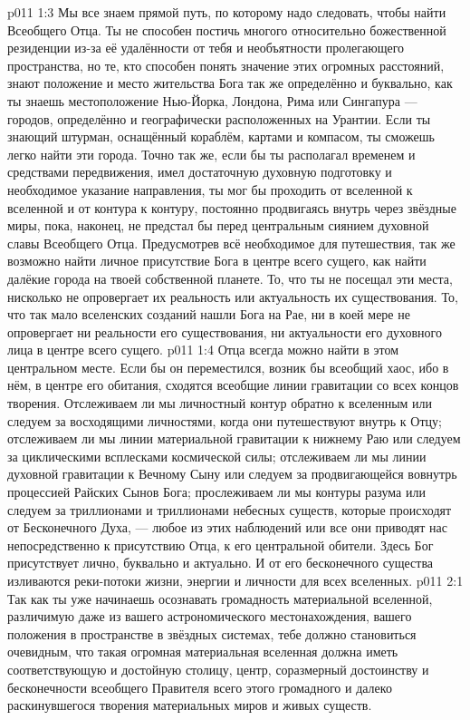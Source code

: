 \vs p011 1:3 \pc Мы все знаем прямой путь, по которому надо следовать, чтобы найти Всеобщего Отца. Ты не способен постичь многого относительно божественной резиденции из\hyp{}за её удалённости от тебя и необъятности пролегающего пространства, но те, кто способен понять значение этих огромных расстояний, знают положение и место жительства Бога так же определённо и буквально, как ты знаешь местоположение Нью\hyp{}Йорка, Лондона, Рима или Сингапура --- городов, определённо и географически расположенных на Урантии. Если ты знающий штурман, оснащённый кораблём, картами и компасом, ты сможешь легко найти эти города. Точно так же, если бы ты располагал временем и средствами передвижения, имел достаточную духовную подготовку и необходимое указание направления, ты мог бы проходить от вселенной к вселенной и от контура к контуру, постоянно продвигаясь внутрь через звёздные миры, пока, наконец, не предстал бы перед центральным сиянием духовной славы Всеобщего Отца. Предусмотрев всё необходимое для путешествия, так же возможно найти личное присутствие Бога в центре всего сущего, как найти далёкие города на твоей собственной планете. То, что ты не посещал эти места, нисколько не опровергает их реальность или актуальность их существования. То, что так мало вселенских созданий нашли Бога на Рае, ни в коей мере не опровергает ни реальности его существования, ни актуальности его духовного лица в центре всего сущего.
\vs p011 1:4 Отца всегда можно найти в этом центральном месте. Если бы он переместился, возник бы всеобщий хаос, ибо в нём, в центре его обитания, сходятся всеобщие линии гравитации со всех концов творения. Отслеживаем ли мы личностный контур обратно к вселенным или следуем за восходящими личностями, когда они путешествуют внутрь к Отцу; отслеживаем ли мы линии материальной гравитации к нижнему Раю или следуем за циклическими всплесками космической силы; отслеживаем ли мы линии духовной гравитации к Вечному Сыну или следуем за продвигающейся вовнутрь процессией Райских Сынов Бога; прослеживаем ли мы контуры разума или следуем за триллионами и триллионами небесных существ, которые происходят от Бесконечного Духа, --- любое из этих наблюдений или все они приводят нас непосредственно к присутствию Отца, к его центральной обители. Здесь Бог присутствует лично, буквально и актуально. И от его бесконечного существа изливаются реки\hyp{}потоки жизни, энергии и личности для всех вселенных.
\vs p011 2:1 Так как ты уже начинаешь осознавать громадность материальной вселенной, различимую даже из вашего астрономического местонахождения, вашего положения в пространстве в звёздных системах, тебе должно становиться очевидным, что такая огромная материальная вселенная должна иметь соответствующую и достойную столицу, центр, соразмерный достоинству и бесконечности всеобщего Правителя всего этого громадного и далеко раскинувшегося творения материальных миров и живых существ.
